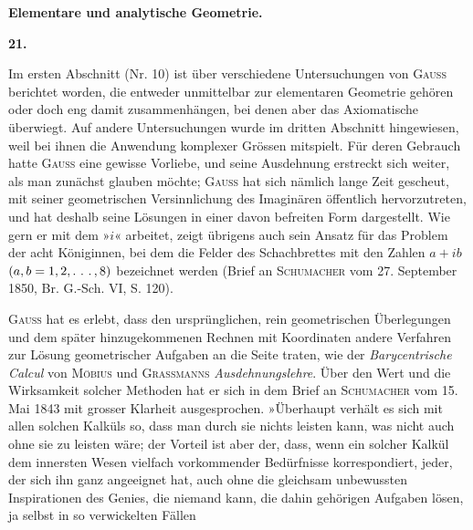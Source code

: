 \clearpage\begingroup{}
\renewcommand{\thefootnote}{\arabic{footnote})}\setcounter{footnote}{0}
\begin{center}
\par\smallskip
\textbf{Elementare und analytische Geometrie.}\par\medskip
\textbf{21.}\par\smallskip
{}
\end{center}
\noindent\hspace*{\parindent}Im ersten Abschnitt (Nr. 10) ist über verschiedene Untersuchungen von
\textsc{Gauss} berichtet worden, die entweder unmittelbar zur elementaren Geometrie
gehören oder doch eng damit zusammenhängen, bei denen aber das Axiomatische
überwiegt. Auf andere Untersuchungen wurde im dritten Abschnitt
hingewiesen, weil bei ihnen die Anwendung komplexer Grössen mitspielt.
Für deren Gebrauch hatte \textsc{Gauss} eine gewisse Vorliebe, und seine Ausdehnung
erstreckt sich weiter, als man zunächst glauben möchte; \textsc{Gauss} hat sich nämlich
lange Zeit gescheut, mit seiner geometrischen Versinnlichung des Imaginären
öffentlich hervorzutreten, und hat deshalb seine Lösungen in einer davon
befreiten Form dargestellt. Wie gern er mit dem »\(i\)« arbeitet, zeigt übrigens
auch sein Ansatz für das Problem der acht Königinnen, bei dem die Felder
des Schachbrettes mit den Zahlen \(a+ib\) \((a,b=1,2,\ldotp\,\ldotp\,\ldotp,8)\) bezeichnet werden
(Brief an \textsc{Schumacher} vom 27. September 1850, Br. G.-Sch. VI, S. 120).
\par
\textsc{Gauss} hat es erlebt, dass den ursprünglichen, rein geometrischen Überlegungen
und dem später hinzugekommenen Rechnen mit Koordinaten andere
Verfahren zur Lösung geometrischer Aufgaben an die Seite traten, wie der
\textit{Barycentrische Calcul} von \textsc{Möbius} und \textsc{Grassmanns} \textit{Ausdehnungslehre}. Über
den Wert und die Wirksamkeit solcher Methoden hat er sich in dem Brief
an \textsc{Schumacher} vom 15. Mai 1843 mit grosser Klarheit ausgesprochen. »Überhaupt
verhält es sich mit allen solchen Kalküls so, dass man durch sie nichts
leisten kann, was nicht auch ohne sie zu leisten wäre; der Vorteil ist aber
der, dass, wenn ein solcher Kalkül dem innersten Wesen vielfach vorkommender
Bedürfnisse korrespondiert, jeder, der sich ihn ganz angeeignet hat, auch ohne
die gleichsam unbewussten Inspirationen des Genies, die niemand 
kann, die dahin gehörigen Aufgaben lösen, ja selbst in so verwickelten Fällen

